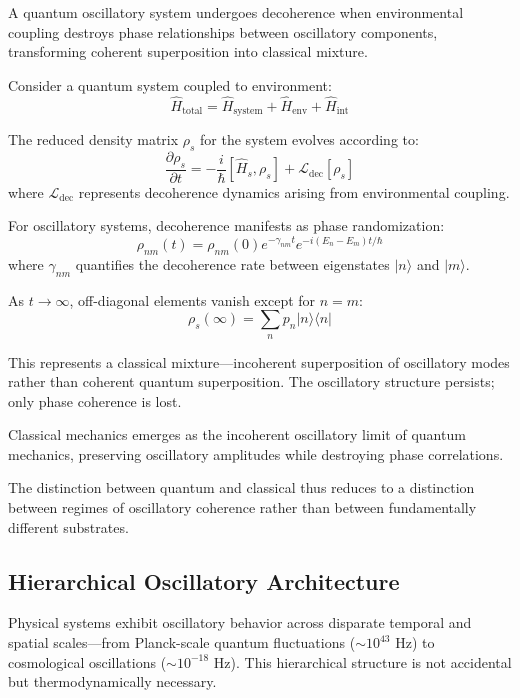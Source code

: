 \begin{definition}
A quantum oscillatory system undergoes decoherence when environmental coupling destroys phase relationships between oscillatory components, transforming coherent superposition into classical mixture.
\end{definition}

Consider a quantum system coupled to environment:
$$\hat{H}_{\text{total}} = \hat{H}_{\text{system}} + \hat{H}_{\text{env}} + \hat{H}_{\text{int}}$$

The reduced density matrix $\rho_s$ for the system evolves according to:
$$\frac{\partial \rho_s}{\partial t} = -\frac{i}{\hbar}[\hat{H}_s, \rho_s] + \mathcal{L}_{\text{dec}}[\rho_s]$$
where $\mathcal{L}_{\text{dec}}$ represents decoherence dynamics arising from environmental coupling.

For oscillatory systems, decoherence manifests as phase randomization:
$$\rho_{nm}(t) = \rho_{nm}(0) e^{-\gamma_{nm} t} e^{-i(E_n - E_m)t/\hbar}$$
where $\gamma_{nm}$ quantifies the decoherence rate between eigenstates $|n\rangle$ and $|m\rangle$.

As $t \to \infty$, off-diagonal elements vanish except for $n = m$:
$$\rho_s(\infty) = \sum_n p_n |n\rangle\langle n|$$

This represents a classical mixture—incoherent superposition of oscillatory modes rather than coherent quantum superposition. The oscillatory structure persists; only phase coherence is lost.

\begin{principle}
Classical mechanics emerges as the incoherent oscillatory limit of quantum mechanics, preserving oscillatory amplitudes while destroying phase correlations.
\end{principle}

The distinction between quantum and classical thus reduces to a distinction between regimes of oscillatory coherence rather than between fundamentally different substrates.

\subsection{Hierarchical Oscillatory Architecture}

Physical systems exhibit oscillatory behavior across disparate temporal and spatial scales—from Planck-scale quantum fluctuations ($\sim 10^{43}$ Hz) to cosmological oscillations ($\sim 10^{-18}$ Hz). This hierarchical structure is not accidental but thermodynamically necessary.

